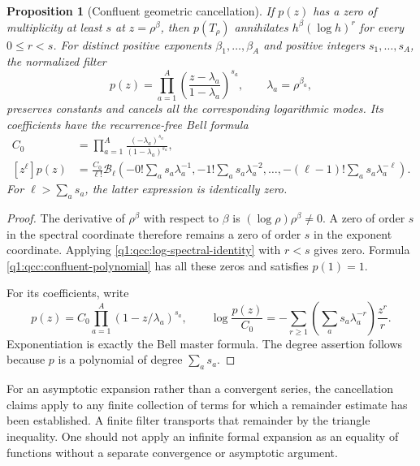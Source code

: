\documentclass[11pt,a4paper,oneside,openany]{book}
\newtheorem{proposition}[theorem]{Proposition}
\theoremstyle{definition}
\theoremstyle{remark}
\newcommand{\Y}[1]{\mathcal B_{#1}}
\begin{document}
\begin{proposition}[Confluent geometric cancellation]
\label{q1:qcc:confluent-filter}
If \(p(z)\) has a zero of multiplicity at least \(s\) at
\(z=\rho^\beta\), then \(p(T_\rho)\) annihilates
\(h^\beta(\log h)^r\) for every \(0\le r<s\).
For distinct positive exponents \(\beta_1,\ldots,\beta_A\) and positive
integers \(s_1,\ldots,s_A\), the normalized filter
\begin{equation}\label{q1:qcc:confluent-polynomial}
 p(z)=\prod_{a=1}^{A}
        \left(\frac{z-\lambda_a}{1-\lambda_a}\right)^{s_a},
 \qquad\lambda_a=\rho^{\beta_a},
\end{equation}
preserves constants and cancels all the corresponding logarithmic modes.
Its coefficients have the recurrence-free Bell formula
\begin{align}
 C_0&=\prod_{a=1}^{A}
       \frac{(-\lambda_a)^{s_a}}{(1-\lambda_a)^{s_a}},
       \label{q1:qcc:confluent-C}\\
 [z^\ell]p(z)&=\frac{C_0}{\ell!}
   \Y\ell\left(-0!\sum_a s_a\lambda_a^{-1},
                -1!\sum_a s_a\lambda_a^{-2},\ldots,
                -(\ell-1)!\sum_a s_a\lambda_a^{-\ell}\right).
       \label{q1:qcc:confluent-Bell}
\end{align}
For \(\ell>\sum_a s_a\), the latter expression is identically zero.
\end{proposition}
\begin{proof}
The derivative of \(\rho^\beta\) with respect to \(\beta\) is
\((\log\rho)\rho^\beta\ne0\). A zero of order \(s\) in the
spectral coordinate therefore remains a zero of order \(s\) in the
exponent coordinate. Applying \eqref{q1:qcc:log-spectral-identity} with
\(r<s\) gives zero. Formula \eqref{q1:qcc:confluent-polynomial} has all
these zeros and satisfies \(p(1)=1\).

For its coefficients, write
\[
 p(z)=C_0\prod_{a=1}^{A}(1-z/\lambda_a)^{s_a},\qquad
 \log\frac{p(z)}{C_0}
   =-\sum_{r\ge1}\left(\sum_as_a\lambda_a^{-r}\right)\frac{z^r}{r}.
\]
Exponentiation is exactly the Bell master formula. The degree assertion follows
because \(p\) is a polynomial of degree \(\sum_as_a\).
\end{proof}

For an asymptotic expansion rather than a convergent series, the cancellation
claims apply to any finite collection of terms for which a remainder estimate
has been established. A finite filter transports that remainder by the triangle
inequality. One should not apply an infinite formal expansion as an equality of
functions without a separate convergence or asymptotic argument.
\end{document}
